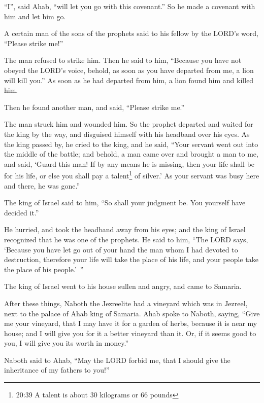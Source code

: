 “I”, said Ahab, “will let you go with this covenant.” So he made a covenant with him and
let him go.

\myverse{}A certain man of the sons of the prophets said to his fellow
by the LORD’s word, “Please strike me!”

The man refused to strike him.
\myverse{}Then he said to him, “Because you have not obeyed the LORD’s voice, behold,
as soon as you have departed from me, a lion will kill you.” As soon as he had departed from him, a lion
found him and killed him.

\myverse{}Then he found another man, and said, “Please strike me.”

The man struck him and wounded him.
\myverse{}So the prophet departed and waited for the king by the way, and disguised
himself with his headband over his eyes.
\myverse{}As the king passed by, he cried to the king, and he said, “Your servant went
out into the middle of the battle; and behold, a man came over and brought a man to me, and said, ‘Guard
this man! If by any means he is missing, then your life shall be for his life, or else you shall pay a
talent\footnote{20:39 A talent is about 30 kilograms or 66 pounds} of silver.’
\myverse{}As your servant was busy here and there, he was gone.”

The king of Israel said to him, “So shall your judgment be. You yourself have decided it.”

\myverse{}He hurried, and took the headband away from his eyes; and the
king of Israel recognized that he was one of the prophets.
\myverse{}He said to him, “The LORD says, ‘Because you have let go out of your hand
the man whom I had devoted to destruction, therefore your life will take the place of his life, and your
people take the place of his people.’ ”

\myverse{}The king of Israel went to his house sullen and angry, and came
to Samaria.


\mychapter{} \myverse*{}After these things, Naboth the Jezreelite had a vineyard which
was in Jezreel, next to the palace of Ahab king of Samaria.
\myverse{}Ahab spoke to Naboth, saying, “Give me your vineyard, that I may have it for
a garden of herbs, because it is near my house; and I will give you for it a better vineyard than it.
Or, if it seems good to you, I will give you its worth in money.”

\myverse{}Naboth said to Ahab, “May the LORD forbid me, that I should give
the inheritance of my fathers to you!”

